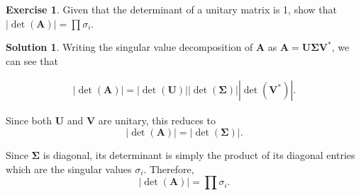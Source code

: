 \documentclass[12pt]{article}
\newcommand{\abs}[1]{ \left| #1 \right| }
\renewcommand{\vec}[1]{\mathbf{#1}}
\theoremstyle{definition}
\newtheorem{exer}{Exercise}
\newtheorem{sol}{Solution}
\theoremstyle{remark}
\begin{document}
\begin{exer}
    Given that the determinant of a unitary matrix is 1, show that $\abs{\det (\vec{A})} = \prod \sigma_i$.
\end{exer}

\begin{sol}
    Writing the singular value decomposition of $\vec{A}$ as $\vec{A} = \vec{U}\vec{\Sigma}\vec{V}^*$, we can see that

    \begin{align}
    \abs{\det(\vec{A})} = \abs{\det(\vec{U})} \abs{\det(\vec{\Sigma})} \abs{\det(\vec{V}^*)}.   
    \end{align}

Since both $\vec{U}$ and $\vec{V}$ are unitary, this reduces to
\begin{equation}
    \abs{\det(\vec{A})} = \abs{\det(\vec{\Sigma})}. 
\end{equation}

Since $\vec{\Sigma}$ is diagonal, its determinant is simply the product of its diagonal entries which are the singular values $\sigma_i$. Therefore,
\begin{equation}
    \abs{\det(\vec{A})} = \prod \sigma_i. 
\end{equation}
\end{sol}
\end{document}
